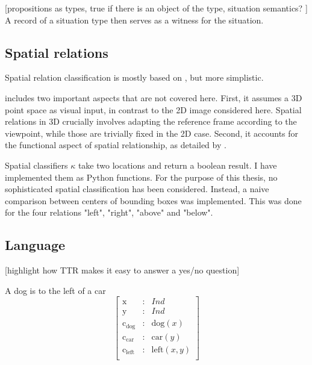[propositions as types, true if there is an object of the type, situation semantics? \cite{BarwiseSituationsAttitudes1981}]
A record of a situation type then serves as a witness for the situation.



\subsection{Spatial relations}

Spatial relation classification is mostly based on \cite{ttrspat}, but more simplistic.

\cite{ttrspat} includes two important aspects that are not covered here.
First, it assumes a 3D point space as visual input, in contrast to the 2D image considered here.
Spatial relations in 3D crucially involves adapting the reference frame according to the viewpoint, while those are trivially fixed in the 2D case.
Second, it accounts for the functional aspect of spatial relationship, as detailed by \cite{CoventryClassificationExtrageometricInfluences2004}.

Spatial classifiers $\kappa$ take two locations and return a boolean result.
I have implemented them as Python functions.
For the purpose of this thesis, no sophisticated spatial classification has been considered.
Instead, a naive comparison between centers of bounding boxes was implemented.
This was done for the four relations "left", "right", "above" and "below".



\subsection{Language}

[highlight how TTR makes it easy to answer a yes/no question]

A dog is to the left of a car
\begin{equation}\left[\begin{array}{rcl}
\text{x} &:& Ind\\
\text{y} &:& Ind\\
\text{c}_\text{dog} &:& \text{dog}(x)\\
\text{c}_\text{car} &:& \text{car}(y)\\
\text{c}_\text{left} &:& \text{left}(x, y)\\
\end{array}\right]\end{equation}


